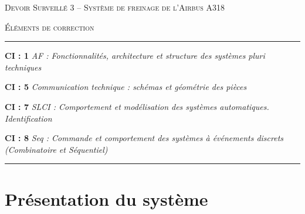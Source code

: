 \documentclass[10pt,oneside]{article}
\begin{document}
\pagestyle{fancy}
\renewcommand{\headrulewidth}{0.2pt}

\fancyhead{}


\renewcommand{\footrulewidth}{0.2pt}
\fancyfoot[C]{\bfseries \thepage}




\vspace{1cm}

\begin{center}
 \huge\textsc{Devoir Surveillé 3 -- Système de freinage de l'Airbus A318}

\vspace{1cm}

 \large\textsc{\'Eléments de correction}
\end{center}

\vspace{1cm}


\noindent\rule{\linewidth}{.2pt}
\begin{center}
\large\textbf{CI : 1} \textit{AF : Fonctionnalités, architecture et structure
des systèmes pluri techniques}

 \large\textbf{CI : 5} \textit{Communication technique : schémas et géométrie
des pièces}

 \large\textbf{CI : 7} \textit{SLCI : Comportement et modélisation des systèmes
automatiques. Identification }

 \large\textbf{CI : 8} \textit{Seq : Commande et comportement des systèmes à
événements discrets (Combinatoire et Séquentiel)}

\end{center}
\noindent\rule{\linewidth}{.2pt}



\section{Présentation du système}
\end{document}
